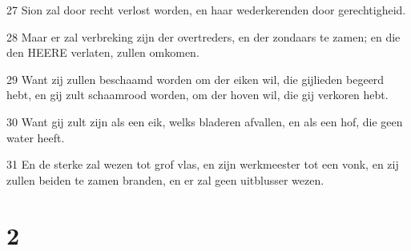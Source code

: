 \par 27 Sion zal door recht verlost worden, en haar wederkerenden door gerechtigheid.
\par 28 Maar er zal verbreking zijn der overtreders, en der zondaars te zamen; en die den HEERE verlaten, zullen omkomen.
\par 29 Want zij zullen beschaamd worden om der eiken wil, die gijlieden begeerd hebt, en gij zult schaamrood worden, om der hoven wil, die gij verkoren hebt.
\par 30 Want gij zult zijn als een eik, welks bladeren afvallen, en als een hof, die geen water heeft.
\par 31 En de sterke zal wezen tot grof vlas, en zijn werkmeester tot een vonk, en zij zullen beiden te zamen branden, en er zal geen uitblusser wezen.

\chapter{2}

